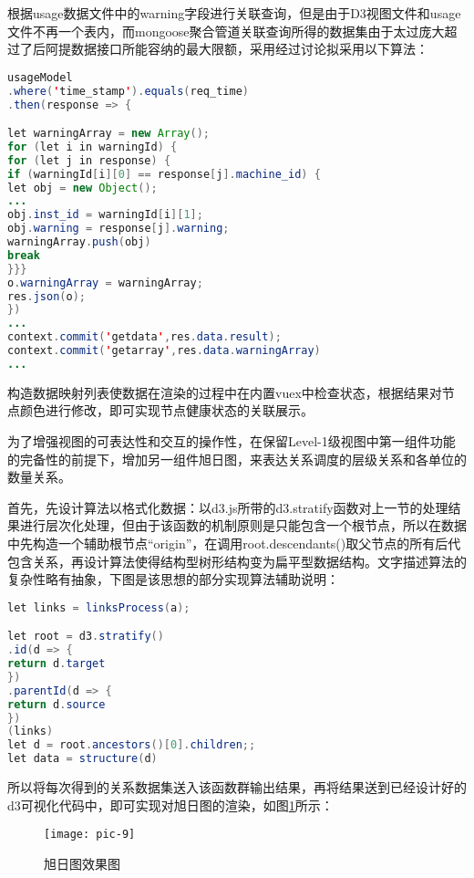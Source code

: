 
根据usage数据文件中的warning字段进行关联查询，但是由于D3视图文件和usage文件不再一个表内，而mongoose聚合管道关联查询所得的数据集由于太过庞大超过了后阿提数据接口所能容纳的最大限额，采用经过讨论拟采用以下算法：

\begin{lstlisting}[caption=基于vuex对数据的集中式管理,frame=shadowbox,language={java}]
usageModel
.where('time_stamp').equals(req_time)
.then(response => {

let warningArray = new Array();
for (let i in warningId) {
for (let j in response) {
if (warningId[i][0] == response[j].machine_id) {
let obj = new Object();
...
obj.inst_id = warningId[i][1];
obj.warning = response[j].warning;
warningArray.push(obj)
break
}}}
o.warningArray = warningArray;
res.json(o);
})
...
context.commit('getdata',res.data.result);
context.commit('getarray',res.data.warningArray)
...
\end{lstlisting}

构造数据映射列表使数据在渲染的过程中在内置vuex中检查状态，根据结果对节点颜色进行修改，即可实现节点健康状态的关联展示。


为了增强视图的可表达性和交互的操作性，在保留Level-1级视图中第一组件功能的完备性的前提下，增加另一组件旭日图，来表达关系调度的层级关系和各单位的数量关系。

首先，先设计算法以格式化数据：以d3.js所带的d3.stratify函数对上一节的处理结果进行层次化处理，但由于该函数的机制原则是只能包含一个根节点，所以在数据中先构造一个辅助根节点“origin”，在调用root.descendants()取父节点的所有后代包含关系，再设计算法使得结构型树形结构变为扁平型数据结构。文字描述算法的复杂性略有抽象，下图是该思想的部分实现算法辅助说明：

\begin{lstlisting}[caption=构造父子节点结构数据,frame=shadowbox,language={java}]
let links = linksProcess(a);

let root = d3.stratify()
.id(d => {
return d.target
})
.parentId(d => {
return d.source
})
(links)
let d = root.ancestors()[0].children;;
let data = structure(d)
\end{lstlisting}

所以将每次得到的关系数据集送入该函数群输出结果，再将结果送到已经设计好的d3可视化代码中，即可实现对旭日图的渲染，如图\ref{pic-91}所示：

\begin{figure}[h]
	\centering
	\texttt{[image: pic-9]}
	\caption{旭日图效果图}
	\label{pic-91}
\end{figure}

